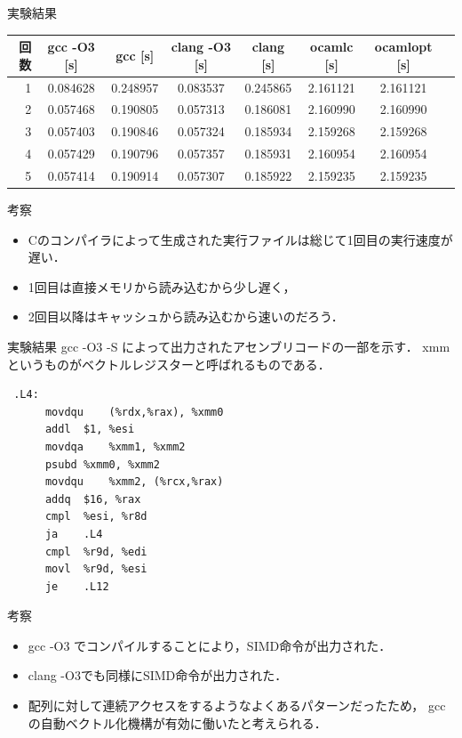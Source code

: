 \documentclass[14pt,dvipdfmx]{beamer}
\theoremstyle{definition}
\begin{document}
\begin{frame}{実験結果}

  \begin{table}[htb]
    \scriptsize
    \centering
    \begin{tabular}{|r|c|c|c|c|c|c|c|} \hline
     回数& gcc -O3 [s]&gcc [s]& clang -O3 [s]& clang [s]& ocamlc [s]& ocamlopt [s]\\ \hline
     1& 0.084628 & 0.248957 & 0.083537 & 0.245865 & 2.161121  & 2.161121 \\ \hline
		 2& 0.057468 & 0.190805 & 0.057313 & 0.186081 & 2.160990	& 2.160990 \\ \hline
		 3& 0.057403 & 0.190846 & 0.057324 & 0.185934 & 2.159268	& 2.159268 \\ \hline
		 4& 0.057429 & 0.190796 & 0.057357 & 0.185931 & 2.160954	& 2.160954 \\ \hline
		 5& 0.057414 & 0.190914 & 0.057307 & 0.185922 & 2.159235	& 2.159235 \\ \hline
    \end{tabular}
  \end{table}
\end{frame}

\begin{frame}{考察}
  \begin{itemize}
  \item Cのコンパイラによって生成された実行ファイルは総じて1回目の実行速度が遅い．
  \item 1回目は直接メモリから読み込むから少し遅く，
  \item 2回目以降はキャッシュから読み込むから速いのだろう．
  \end{itemize}
\end{frame}

\begin{frame}[containsverbatim]{実験結果}
  gcc -O3 -S によって出力されたアセンブリコードの一部を示す．
  xmmというものがベクトルレジスターと呼ばれるものである．
\begin{verbatim}
 .L4:
	  movdqu	(%rdx,%rax), %xmm0
	  addl	$1, %esi
	  movdqa	%xmm1, %xmm2
	  psubd	%xmm0, %xmm2
	  movdqu	%xmm2, (%rcx,%rax)
	  addq	$16, %rax
	  cmpl	%esi, %r8d
	  ja	.L4
	  cmpl	%r9d, %edi
	  movl	%r9d, %esi
	  je	.L12
\end{verbatim}
\end{frame}

\begin{frame}{考察}
  \begin{itemize}
  \item gcc -O3 でコンパイルすることにより，SIMD命令が出力された．
  \item clang -O3でも同様にSIMD命令が出力された．
  \item 配列に対して連続アクセスをするようなよくあるパターンだったため，
    gccの自動ベクトル化機構が有効に働いたと考えられる．
  \end{itemize}
\end{frame}
\end{document}
